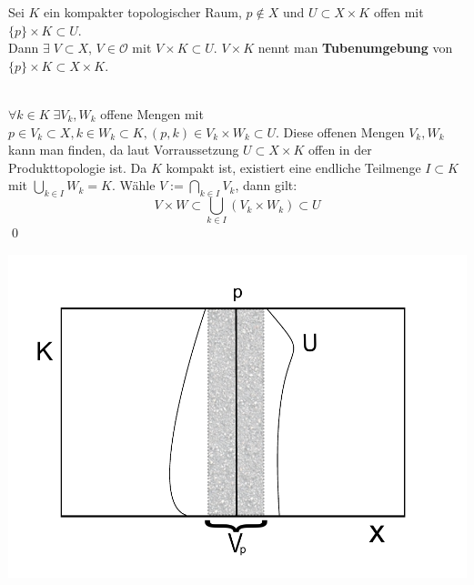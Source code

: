 	\begin{Lemma}[Tubenlemma]
		Sei \(K \) ein kompakter topologischer Raum,  \(p \notin X \) und \( U \subset X \times K \) offen mit \( \{p\} \times K \subset U \). \\
		Dann \( \exists \; V \subset X \), \( V \in \mathcal{O} \) mit \( V \times K \subset U \). \( V \times K \) nennt man { \bf Tubenumgebung } von 
		\( \{p\} \times K \subset X \times K \).
	\end{Lemma} 
		\\
		\( \forall k \in K \; \exists V_{k}, W_{k}\) offene Mengen mit \( p \in V_{k} \subset X, k \in W_{k} \subset K, (p,k) \in  V_{k} \times W_{k} \subset U\).
		Diese offenen Mengen \(V_{k}, W_{k}\) kann man finden, da laut Vorraussetzung \(U  \subset X \times K \) offen in der Produkttopologie ist.
		Da \(K \) kompakt ist, existiert eine endliche Teilmenge
		\( I \subset K \) mit \( \bigcup_{ k \in I } W_{k} = K \). Wähle \(V := \bigcap_{ k \in I } V_{k} \), dann gilt:
		\[ V \times W \subset \bigcup_{k \in I} (V_{k} \times W_{k}) \subset U \]
	\qed
	
	\includegraphics{tubenlemma.pdf} 
	
